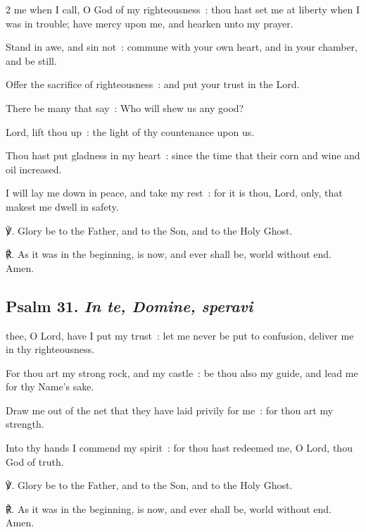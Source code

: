 \begin{multicols}{2}
 me when I call, O God of my righteousness~: thou hast set me at liberty when I was in trouble; have mercy upon me, and hearken unto my prayer.\par
{}
Stand in awe, and sin not~: commune with your own heart, and in your chamber, and be still.\par
{}Offer the sacrifice of righteousness~: and put your trust in the Lord.\par
{}There be many that say~: Who will shew us any good?\par
{}Lord, lift thou up~: the light of thy countenance upon us.\par
{}Thou hast put gladness in my heart~: since the time that their corn and wine and oil increased.\par
{}I will lay me down in peace, and take my rest~: for it is thou, Lord, only, that makest me dwell in safety.\par
℣. Glory be to the Father, and to the Son, and to the Holy Ghost.\par
℟. As it was in the beginning, is now, and ever shall be, world without end. Amen.

\subsection{Psalm 31. \textit{In te, Domine, speravi}}
 thee, O Lord, have I put my trust~: let me never be put to confusion, deliver me in thy righteousness.\par
{}
For thou art my strong rock, and my castle~: be thou also my guide, and lead me for thy Name's sake.\par
{}Draw me out of the net that they have laid privily for me~: for thou art my strength.\par
{}Into thy hands I commend my spirit~: for thou hast redeemed me, O Lord, thou God of truth.\par
℣. Glory be to the Father, and to the Son, and to the Holy Ghost.\par
℟. As it was in the beginning, is now, and ever shall be, world without end. Amen.


\end{multicols}
